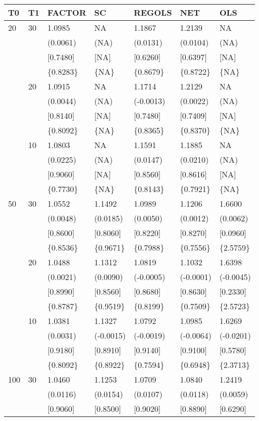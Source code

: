 \begin{table}[ht]
\centering
\begin{tabular}{lllllll}
\hline
T0&T1&FACTOR&SC&REGOLS&NET&OLS\\
\hline
20&30&1.0985&NA&1.1867&1.2139&NA\\
&&(0.0061)&(NA)&(0.0131)&(0.0104)&(NA)\\
&&[0.7480]&[NA]&[0.6260]&[0.6397]&[NA]\\
&&\{0.8283\}&\{NA\}&\{0.8679\}&\{0.8722\}&\{NA\}\\
&20&1.0915&NA&1.1714&1.2129&NA\\
&&(0.0044)&(NA)&(-0.0013)&(0.0022)&(NA)\\
&&[0.8140]&[NA]&[0.7480]&[0.7409]&[NA]\\
&&\{0.8092\}&\{NA\}&\{0.8365\}&\{0.8370\}&\{NA\}\\
&10&1.0803&NA&1.1591&1.1885&NA\\
&&(0.0225)&(NA)&(0.0147)&(0.0210)&(NA)\\
&&[0.9060]&[NA]&[0.8560]&[0.8616]&[NA]\\
&&\{0.7730\}&\{NA\}&\{0.8143\}&\{0.7921\}&\{NA\}\\
50&30&1.0552&1.1492&1.0989&1.1206&1.6600\\
&&(0.0048)&(0.0185)&(0.0050)&(0.0012)&(0.0062)\\
&&[0.8600]&[0.8060]&[0.8220]&[0.8270]&[0.0960]\\
&&\{0.8536\}&\{0.9671\}&\{0.7988\}&\{0.7556\}&\{2.5759\}\\
&20&1.0488&1.1312&1.0819&1.1032&1.6398\\
&&(0.0021)&(0.0090)&(-0.0005)&(-0.0001)&(-0.0045)\\
&&[0.8990]&[0.8560]&[0.8680]&[0.8630]&[0.2330]\\
&&\{0.8787\}&\{0.9519\}&\{0.8199\}&\{0.7509\}&\{2.5723\}\\
&10&1.0381&1.1327&1.0792&1.0985&1.6269\\
&&(0.0031)&(-0.0015)&(-0.0019)&(-0.0064)&(-0.0201)\\
&&[0.9180]&[0.8910]&[0.9140]&[0.9100]&[0.5780]\\
&&\{0.8092\}&\{0.8922\}&\{0.7594\}&\{0.6948\}&\{2.3713\}\\
100&30&1.0460&1.1253&1.0709&1.0840&1.2419\\
&&(0.0116)&(0.0154)&(0.0107)&(0.0118)&(0.0059)\\
&&[0.9060]&[0.8500]&[0.9020]&[0.8890]&[0.6290]\\

\end{tabular}
\end{table}
